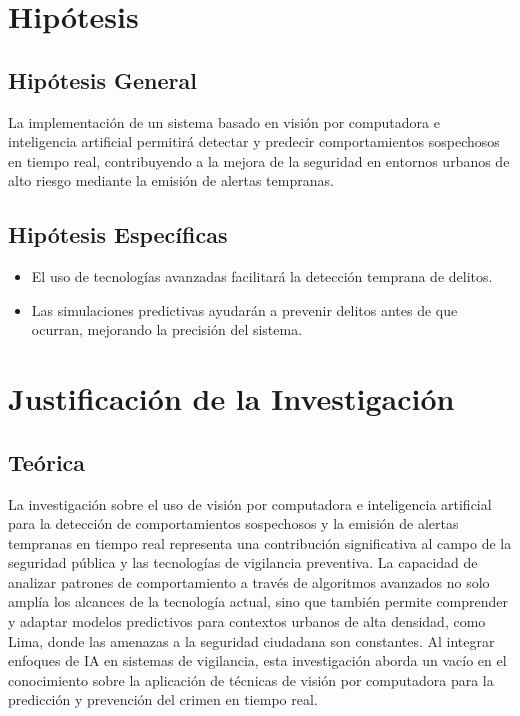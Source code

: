 \documentclass[listof=nochaptergap,12pt,times,authoryear]{report}
\begin{document}
\chapter{Hipótesis}


\section{Hipótesis General}
La implementación de un sistema basado en visión por computadora e inteligencia artificial permitirá detectar y predecir comportamientos sospechosos en tiempo real, contribuyendo a la mejora de la seguridad en entornos urbanos de alto riesgo mediante la emisión de alertas tempranas.

\section{Hipótesis Específicas}
\begin{itemize}
    \item El uso de tecnologías avanzadas facilitará la detección temprana de delitos.
    \item Las simulaciones predictivas ayudarán a prevenir delitos antes de que ocurran, mejorando la precisión del sistema.
\end{itemize}






\chapter{Justificación de la Investigación}

\section{Teórica}
La investigación sobre el uso de visión por computadora e inteligencia artificial para la detección de comportamientos sospechosos y la emisión de alertas tempranas en tiempo real representa una contribución significativa al campo de la seguridad pública y las tecnologías de vigilancia preventiva. La capacidad de analizar patrones de comportamiento a través de algoritmos avanzados no solo amplía los alcances de la tecnología actual, sino que también permite comprender y adaptar modelos predictivos para contextos urbanos de alta densidad, como Lima, donde las amenazas a la seguridad ciudadana son constantes. Al integrar enfoques de IA en sistemas de vigilancia, esta investigación aborda un vacío en el conocimiento sobre la aplicación de técnicas de visión por computadora para la predicción y prevención del crimen en tiempo real.
\end{document}
